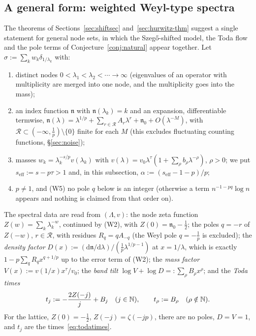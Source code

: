\subsection{A general form: weighted Weyl-type spectra}\label{sec:conj-W}
The theorems of Sections~\ref{sec:shiftsec} and~\ref{sec:hurwitz-thm} suggest a single statement for general node sets, in which
the Szeg\H{o}-shifted model, the Toda flow and the pole terms of Conjecture~\ref{conj:natural} appear together. Let
$\sigma:=\sum_kw_k\delta_{1/\lambda_k}$ with:
\begin{enumerate}
\item[(W1)] distinct nodes $0<\lambda_1<\lambda_2<\dotsb\to\infty$ (eigenvalues of an operator with multiplicity are merged into one
node, and the multiplicity goes into the mass);
\item[(W2)] an index function $\mathfrak n$ with $\mathfrak n(\lambda_k)=k$ and an expansion, differentiable termwise,
$\mathfrak n(\lambda)=\lambda^{1/p}+\sum_{r\in\mathcal R}A_r\lambda^r+\mathfrak n_0+O(\lambda^{-M})$, with $\mathcal R\subset(-\infty,\frac1p)\setminus\{0\}$
finite for each $M$ (this excludes fluctuating counting functions, \S\ref{sec:noise});
\item[(W3)] masses $w_k=\lambda_k^{-s/p}v(\lambda_k)$ with $v(\lambda)=v_0\lambda^\tau(1+\sum_\rho b_\rho\lambda^{-\rho})$, $\rho>0$; we put
$s_{\mathrm{eff}}:=s-p\tau>1$ and, in this subsection, $\alpha:=(s_{\mathrm{eff}}-1-p)/p$;
\item[(W4)] $p\ne1$, and (W5) no pole $q$ below is an integer (otherwise a term $n^{-1-pq}\log n$ appears and nothing is claimed from
that order on).
\end{enumerate}
The spectral data are read from $(\Lambda,v)$: the node zeta function $Z(w)=\sum_k\lambda_k^{-w}$, continued by (W2), with
$Z(0)=\mathfrak n_0-\frac12$; the poles $q=-r$ of $Z(-w)$, $r\in\mathcal R$, with residues $R_q=qA_{-q}$ (the Weyl pole $q=-\frac1p$ is
excluded); the \emph{density factor} $D(x):=(\mathrm d\mathfrak n/\mathrm d\lambda)/(\frac1p\lambda^{1/p-1})$ at $x=1/\lambda$, which is exactly
$1-p\sum_qR_qx^{q+1/p}$ up to the error term of (W2); the \emph{mass factor} $V(x):=v(1/x)x^\tau/v_0$; the \emph{band tilt}
$\log V+\log D=:\sum_\rho B_\rho x^\rho$; and the \emph{Toda times}
\[
  t_j:=-\frac{2Z(-j)}j+B_j\quad(j\in\mathbb{N}),\qquad t_\rho:=B_\rho\quad(\rho\notin\mathbb{N}).
\]
For the lattice, $Z(0)=-\frac12$, $Z(-j)=\zeta(-jp)$, there are no poles, $D=V=1$, and $t_j$ are the times~\eqref{eq:todatimes}.

